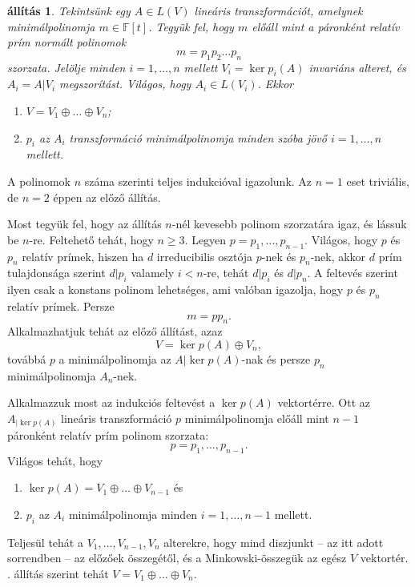 \documentclass[9pt, a4paper, showtrims]{memoir}
\makeatletter
\let\Aref\relax
\renewenvironment{proof}[1][\proofname]
    {\par\pushQED{\qed}%
    \normalfont \topsep6\p@\@plus6\p@\relax
    \trivlist
    \item[\hskip\labelsep
        \itshape
    #1\@addpunct{:}]\ignorespaces}
    {\popQED\endtrivlist\@endpefalse}
\theoremstyle{plain}
\newtheorem{proposition}{állítás}[chapter]
\theoremstyle{remark}
\theoremstyle{definition}
\makeatother
\begin{document}
    \begin{proposition}\label{pr:redukcio-primszorzat}
        Tekintsünk egy $A\in L\left( V \right)$ lineáris transzformációt,
        amelynek minimálpolinomja $m\in\mathbb{F}\left[ t \right]$.
        Tegyük fel, hogy $m$ előáll mint a páronként relatív prím
        normált polinomok
        \[
            m=p_1p_2\dots p_n
        \]
        szorzata.
        Jelölje minden $i=1,\dots,n$ mellett $V_i=\ker p_i\left( A \right)$
        invariáns alteret, és $A_i=A|V_i$ megszorítást.
        Világos, hogy $A_i\in L\left( V_i \right)$.
        Ekkor
        \begin{enumerate}
            \item $V=V_1\oplus\dots\oplus V_n$;
            \item $p_i$ az $A_i$ transzformáció minimálpolinomja minden szóba jövő
                $i=1,\dots,n$ mellett.\qedhere
        \end{enumerate}
    \end{proposition}
    \begin{proof}
        A polinomok $n$ száma szerinti teljes indukcióval igazolunk.
        Az $n=1$ eset triviális, de $n=2$ éppen az előző állítás.

        Most tegyük fel, hogy az állítás $n$-nél kevesebb polinom szorzatára igaz, 
        és lássuk be $n$-re.
        Feltehető tehát, hogy $n\geq 3$.
        Legyen $p=p_1,\dots,p_{n-1}$.
        Világos, hogy $p$ és $p_n$ relatív prímek, hiszen ha $d$ irreducibilis osztója
        $p$-nek és $p_n$-nek, 
        akkor $d$ prím tulajdonsága szerint $d|p_i$ valamely $i<n$-re,
        tehát $d|p_i$ és $d|p_n$. 
        A feltevés szerint ilyen csak a konstans polinom lehetséges, 
        ami valóban igazolja, hogy $p$ és $p_n$ relatív prímek.
        Persze 
        \[
            m=pp_n.
        \]
        Alkalmazhatjuk tehát az előző állítást, azaz
        \[
            V=\ker p\left( A \right)\oplus V_n,
        \]
        továbbá $p$ a minimálpolinomja az $A|\ker p\left( A \right)$-nak
        és persze $p_n$ minimálpolinomja $A_n$-nek.

        Alkalmazzuk most az indukciós feltevést a $\ker p\left( A \right)$ vektortérre.
        Ott az $A_{|\ker p\left( A \right)}$ lineáris transzformáció $p$ minimálpolinomja
        előáll mint $n-1$ páronként relatív prím polinom szorzata:
        \[
            p=p_1,\dots,p_{n-1}.
        \]
        Világos tehát, hogy 
        \begin{enumerate}
            \item 
                $\ker p\left( A \right)=V_1\oplus\dots\oplus V_{n-1}$ és
            \item $p_i$ az $A_i$ minimálpolinomja minden $i=1,\dots,n-1$ mellett.
        \end{enumerate}
        Teljesül tehát a $V_1,\dots,V_{n-1},V_n$ alterekre, 
        hogy mind diszjunkt -- az itt adott sorrendben -- az előzőek összegétől,
        és a Minkowski-összegük az egész $V$ vektortér.
        \Aref{pr:dirosszegelozo}. állítás szerint tehát $V=V_1\oplus\dots\oplus V_n$.
    \end{proof}
\end{document}
